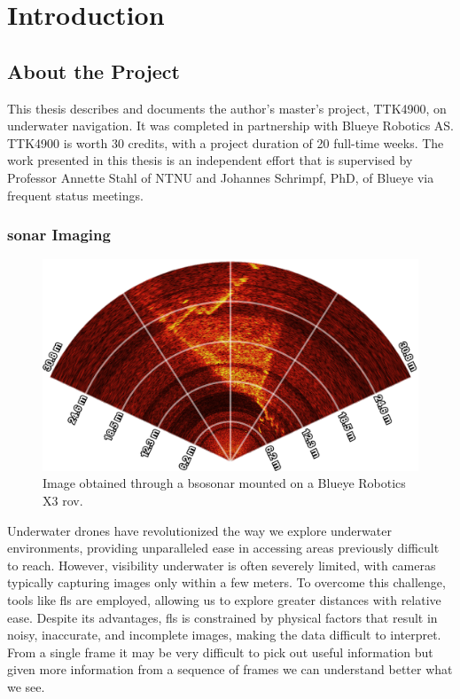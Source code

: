 \chapter{Introduction}
\label{chap:introduction}

\section{About the Project}

This thesis describes and documents the author's master's project, TTK4900, on underwater navigation. It was completed in partnership with Blueye Robotics AS. TTK4900 is worth 30 credits, with a project duration of 20 full-time weeks. The work presented in this thesis is an independent effort that is supervised by Professor Annette Stahl of NTNU and Johannes Schrimpf, PhD, of Blueye via frequent status meetings.

\subsection{\acrshort{sonar} Imaging}

\begin{figure}[H]
  \centering
  \includegraphics[width=.7\textwidth]{figures/sonar_processed.png}
  \caption[\acrshort{fls} image from \acrshort{bsosonar}.]{Image obtained through a \acrfull{bsosonar} mounted on a Blueye Robotics X3 \acrshort{rov}.}
  \label{fig:sonarapp}
\end{figure}

Underwater drones have revolutionized the way we explore underwater environments, providing unparalleled ease in accessing areas previously difficult to reach. However, visibility underwater is often severely limited, with cameras typically capturing images only within a few meters. To overcome this challenge, tools like \acrfull{fls}  are employed, allowing us to explore greater distances with relative ease. Despite its advantages, \acrshort{fls} is constrained by physical factors that result in noisy, inaccurate, and incomplete images, making the data difficult to interpret. From a single frame it may be very difficult to pick out useful information but given more information from a sequence of frames we can understand better what we see.

